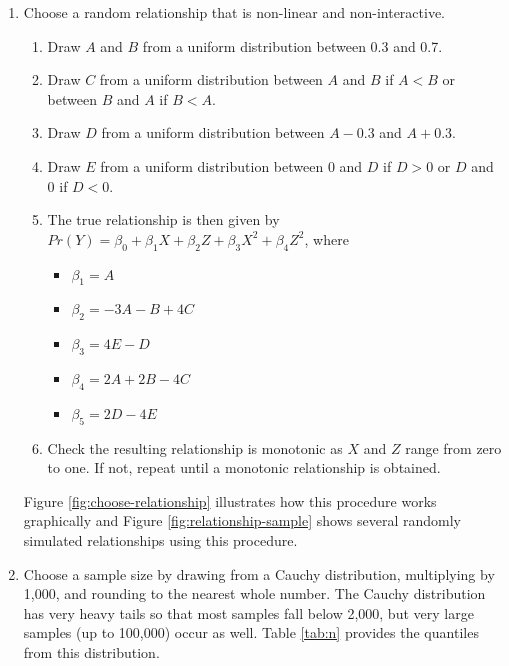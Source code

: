 \documentclass[12pt]{article}
\begin{document}
\begin{appendix}
\begin{enumerate}
\item Choose a random relationship that is non-linear and non-interactive.
        \begin{enumerate}
        \item Draw $A$ and $B$ from a uniform distribution between 0.3 and 0.7.
        \item Draw $C$ from a uniform distribution between $A$ and $B$ if $A < B$ or between $B$ and $A$ if $B < A$.
        \item Draw $D$ from a uniform distribution between $A - 0.3$ and $A + 0.3$.
        \item Draw $E$ from a uniform distribution between 0 and $D$ if $D > 0$ or $D$ and 0 if $D < 0$.
        \item The true relationship is then given by $Pr(Y) = \beta_0 + \beta_1X + \beta_2Z + \beta_3X^2 + \beta_4Z^2$, where
                \begin{itemize}
                \item $\beta_1 = A$
                \item $\beta_2 = -3A - B + 4C$ 
                \item $\beta_3 = 4E - D$
                \item $\beta_4 = 2A + 2B - 4C$
                \item $\beta_5 = 2D - 4E$ 
                \end{itemize}
        \item Check the resulting relationship is monotonic as $X$ and $Z$ range from zero to one. If not, repeat until a monotonic relationship is obtained.
        \end{enumerate}
        Figure \ref{fig:choose-relationship} illustrates how this procedure works graphically and Figure    \ref{fig:relationship-sample} shows several randomly simulated relationships using this procedure.



        \item Choose a sample size by drawing from a Cauchy distribution, multiplying by 1,000, and rounding to the nearest whole number. The Cauchy distribution has very heavy tails so that most samples fall below 2,000, but very large samples (up to 100,000) occur as well. Table \ref{tab:n} provides the quantiles from this distribution.
        

\end{enumerate}
\end{appendix}
\end{document}
